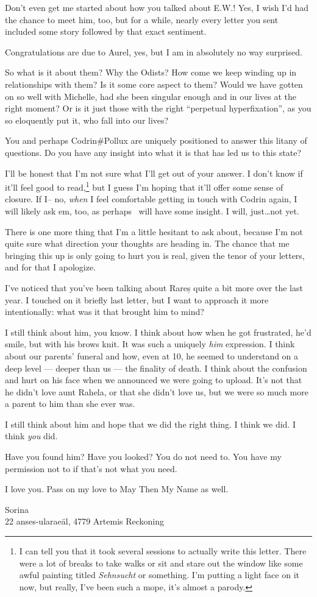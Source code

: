 Don't even get me started about how you talked about E.W.! Yes, I wish I'd had the chance to meet him, too, but for a while, nearly every letter you sent included some story followed by that exact sentiment.

Congratulations are due to Aurel, yes, but I am in absolutely no way surprised.

So what is it about them? Why the Odists? How come we keep winding up in relationships with them? Is it some core aspect to them? Would we have gotten on so well with Michelle, had she been singular enough and in our lives at the right moment? Or is it just those with the right ``perpetual hyperfixation'', as you so eloquently put it, who fall into our lives?

You and perhaps Codrin\#Pollux are uniquely positioned to answer this litany of questions. Do you have any insight into what it is that has led us to this state?

I'll be honest that I'm not sure what I'll get out of your answer. I don't know if it'll feel good to read,\footnote{I can tell you that it took several sessions to actually write this letter. There were a lot of breaks to take walks or sit and stare out the window like some awful painting titled \emph{Sehnsucht} or something. I'm putting a light face on it now, but really, I've been such a mope, it's almost a parody.} but I guess I'm hoping that it'll offer some sense of closure. If I-- no, \emph{when} I feel comfortable getting in touch with Codrin again, I will likely ask em, too, as perhaps \Partner\ will have some insight. I will, just\ldots{}not yet.

There is one more thing that I'm a little hesitant to ask about, because I'm not quite sure what direction your thoughts are heading in. The chance that me bringing this up is only going to hurt you is real, given the tenor of your letters, and for that I apologize.

I've noticed that you've been talking about Rareș quite a bit more over the last year. I touched on it briefly last letter, but I want to approach it more intentionally: what was it that brought him to mind?

I still think about him, you know. I think about how when he got frustrated, he'd smile, but with his brows knit. It was such a uniquely \emph{him} expression. I think about our parents' funeral and how, even at 10, he seemed to understand on a deep level — deeper than us — the finality of death. I think about the confusion and hurt on his face when we announced we were going to upload. It's not that he didn't love aunt Rahela, or that she didn't love us, but we were so much more a parent to him than she ever was.

I still think about him and hope that we did the right thing. I think we did. I think \emph{you} did.

Have you found him? Have you looked? You do not need to. You have my permission not to if that's not what you need.

I love you. Pass on my love to May Then My Name as well.

Sorina\\
22 anses-ularaeäl, 4779 Artemis Reckoning
